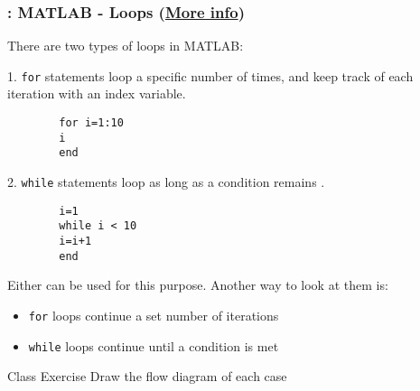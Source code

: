 \documentclass[11pt]{beamer}
\begin{document}
\begin{frame}[fragile]
	
	\frametitle{\secname: MATLAB - Loops 
		(\href{http://www.mathworks.com/help/matlab/matlab_prog/loop-control-statements.html}{More info})}
	
	\begin{block}{}
		\centering There are two types of loops in MATLAB:
	\end{block}
	
	\begin{minipage}[t]{0.55\linewidth}
		1. \verb|for| statements loop a specific number of times, and keep track of each iteration with an  index variable.
		\begin{verbatim}
		for i=1:10
		i
		end
		\end{verbatim}
	\end{minipage}
	\hspace{5pt}
	\begin{minipage}[t]{0.4\linewidth}
		2. \verb|while| statements loop as long as a condition remains .
		\begin{verbatim}
		i=1
		while i < 10
		i=i+1
		end
		\end{verbatim}	
	\end{minipage}
	
	\vspace{15pt}
	Either can be used for this purpose. Another way to look at them is:
	\begin{itemize}
		\item \verb|for| loops continue a set number of iterations
		\item \verb|while| loops continue until a condition is met
	\end{itemize}
	
	\begin{exampleblock}{Class Exercise}
		Draw the flow diagram of each case
	\end{exampleblock}
	
\end{frame}
\end{document}
